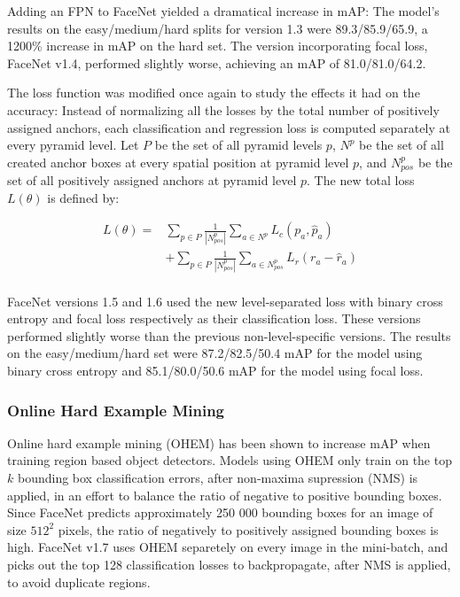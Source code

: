 \documentclass[a4paper, twoside]{article}
\begin{document}
Adding an FPN to FaceNet yielded a dramatical increase in mAP: The model's results on the easy/medium/hard splits for version 1.3 were 89.3/85.9/65.9, a 1200\% increase in mAP on the hard set. The version incorporating focal loss, FaceNet v1.4, performed slightly worse, achieving an mAP of 81.0/81.0/64.2.

The loss function was modified once again to study the effects it had on the accuracy: Instead of normalizing all the losses by the total number of positively assigned anchors, each classification and regression loss is computed separately at every pyramid level. Let $P$ be the set of all pyramid levels $p$, $N^p$ be the set of all created anchor boxes at every spatial position at pyramid level $p$, and $N^p_{pos}$ be the set of all positively assigned anchors at pyramid level $p$. The new total loss $L(\theta)$ is defined by:

\begin{equation}
\begin{split}
	L(\theta) = & \sum_{p \in P} \frac{1}{|N^p_{pos}|} \sum_{a \in N^p} L_c(p_a, \hat{p}_a) \\
	 & + \sum_{p \in P}  \frac{1}{|N^p_{pos}|} \sum_{a \in N^p_{pos}} L_r(r_a - \hat{r}_a)  \\ 
\end{split}
\end{equation}

FaceNet versions 1.5 and 1.6 used the new level-separated loss with binary cross entropy and focal loss respectively as their classification loss. These versions performed slightly worse than the previous non-level-specific versions. The results on the easy/medium/hard set were 87.2/82.5/50.4 mAP for the model using binary cross entropy and 85.1/80.0/50.6 mAP for the model using focal loss.

\subsubsection{Online Hard Example Mining}
Online hard example mining (OHEM) \cite{ohem} has been shown to increase mAP when training region based object detectors. Models using OHEM only train on the top $k$ bounding box classification errors, after non-maxima supression (NMS) is applied, in an effort to balance the ratio of negative to positive bounding boxes. Since FaceNet predicts approximately 250 000 bounding boxes for an image of size $512^2$ pixels, the ratio of negatively to positively assigned bounding boxes is high. FaceNet v1.7 uses OHEM separetely on every image in the mini-batch, and picks out the top 128 classification losses to backpropagate, after NMS is applied, to avoid duplicate regions.
\end{document}

